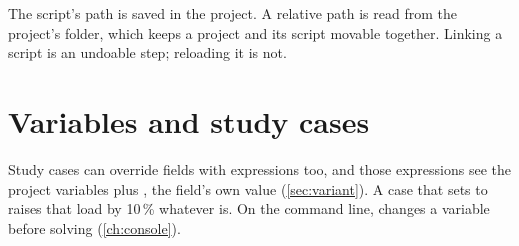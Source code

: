 The script's path is saved in the project. A relative path is read from the project's
folder, which keeps a project and its script movable together. Linking a script is an
undoable step; reloading it is not.

\section{Variables and study cases}

Study cases can override fields with expressions too, and those expressions see the
project variables plus , the field's own value (\cref{sec:variant}). A case
that sets  to  raises that load by 10\,\% whatever
 is. On the command line,  changes a variable before solving
(\cref{ch:console}).
